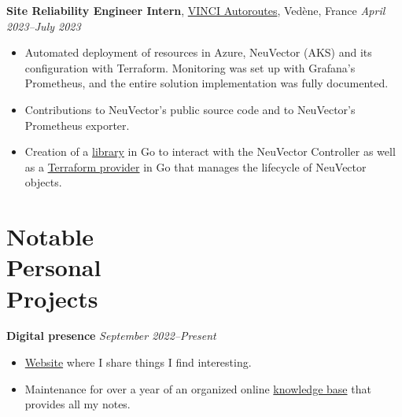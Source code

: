 \documentclass[margin,line]{../res}
\begin{document}
\begin{resume}
  {\bf Site Reliability Engineer Intern},
  \href{https://www.vinci-autoroutes.com}{VINCI Autoroutes}, Vedène, France
  \hfill {\it April 2023--July 2023}
  \vspace*{.05in}
  \begin{itemize}
    \item Automated deployment of resources in Azure, NeuVector (AKS)
      and its configuration with Terraform. Monitoring was set up
      with Grafana's Prometheus, and the entire solution implementation
      was fully documented.
    \item Contributions to NeuVector's public source code and to
      NeuVector's Prometheus exporter.
    \item Creation of a
      \href{https://github.com/theobori/go-neuvector}{library}
      in Go to interact with the NeuVector Controller as well as a
      \href{https://registry.terraform.io/providers/theobori/neuvector/latest}{Terraform
      provider} in Go that manages the lifecycle of NeuVector objects.
  \end{itemize}

  \section{\sc Notable\\ Personal\\ Projects}

  {\bf Digital presence}
  \hfill {\it September 2022--Present}
  \vspace*{.05in}
  \begin{itemize}
    \item \href{https://theobori.cafe}{Website} where I share
      things I find interesting.
    \item Maintenance for over a year of an organized online
      \href{https://zettel.theobori.cafe}{knowledge base} that provides
      all my notes.
  \end{itemize}


\end{resume}
\end{document}
